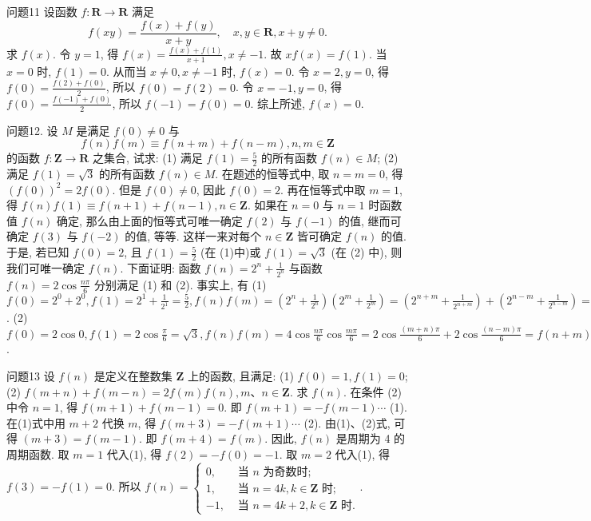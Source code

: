 问题11 设函数 $f: \mathbf{R} \rightarrow \mathbf{R}$ 满足
$$
f(x y)=\frac{f(x)+f(y)}{x+y}, \quad x, y \in \mathbf{R}, x+y \neq 0 .
$$
求 $f(x)$.
令 $y=1$, 得 $f(x)=\frac{f(x)+f(1)}{x+1}, x \neq-1$. 故 $x f(x)=f(1)$. 当 $x=0$ 时, $f(1)=0$. 从而当 $x \neq 0, x \neq-1$ 时, $f(x)=0$. 令 $x=2, y=0$, 得 $f(0)=\frac{f(2)+f(0)}{2}$, 所以 $f(0)=f(2)=0$. 令 $x=-1, y=0$, 得 $f(0)=\frac{f(-1)+f(0)}{2}$, 所以 $f(-1)=f(0)=0$. 综上所述, $f(x)=0$.



问题12. 设 $M$ 是满足 $f(0) \neq 0$ 与
$$
f(n) f(m) \equiv f(n+m)+f(n-m), n, m \in \mathbf{Z}
$$
的函数 $f: \mathbf{Z} \rightarrow \mathbf{R}$ 之集合, 试求:
(1) 满足 $f(1)=\frac{5}{2}$ 的所有函数 $f(n) \in M$;
(2) 满足 $f(1)=\sqrt{3}$ 的所有函数 $f(n) \in M$.
在题述的恒等式中, 取 $n=m=0$, 得 $(f(0))^2=2 f(0)$. 但是 $f(0) \neq 0$, 因此 $f(0)=2$. 再在恒等式中取 $m=1$, 得 $f(n) f(1) \equiv f(n+ 1) +f(n-1), n \in \mathbf{Z}$. 如果在 $n=0$ 与 $n=1$ 时函数值 $f(n)$ 确定, 那么由上面的恒等式可唯一确定 $f(2)$ 与 $f(-1)$ 的值, 继而可确定 $f(3)$ 与 $f(-2)$ 的值, 等等.
这样一来对每个 $n \in \mathbf{Z}$ 皆可确定 $f(n)$ 的值.
于是, 若已知 $f(0)=2$, 且 $f(1)=\frac{5}{2}$ (在 (1)中)或 $f(1)=\sqrt{3}$ (在 (2) 中), 则我们可唯一确定 $f(n)$. 下面证明: 函数 $f(n)=2^n+\frac{1}{2^n}$ 与函数 $f(n)=2 \cos \frac{n \pi}{6}$ 分别满足 (1) 和 (2). 
事实上, 有 (1) $f(0)=2^0+2^0, f(1)=2^1+\frac{1}{2^1}=\frac{5}{2}, f(n) f(m)= \left(2^n+\frac{1}{2^n}\right)\left(2^m+\frac{1}{2^m}\right)=\left(2^{n+m}+\frac{1}{2^{n+m}}\right)+\left(2^{n-m}+\frac{1}{2^{n-m}}\right)=f(n+m)+f(n-m), m, n \in \mathbf{Z}$.
(2) $f(0)=2 \cos 0, f(1)=2 \cos \frac{\pi}{6}=\sqrt{3}, f(n) f(m)= 4 \cos \frac{n \pi}{6} \cos \frac{m \pi}{6}=2 \cos \frac{(m+n) \pi}{6}+2 \cos \frac{(n-m) \pi}{6}=f(n+m)+f(n-m), m, n \in \mathbf{Z}$.



问题13 设 $f(n)$ 是定义在整数集 $\mathbf{Z}$ 上的函数, 且满足:
(1) $f(0)=1, f(1)=0$;
(2) $f(m+n)+f(m-n)=2 f(m) f(n), m 、 n \in \mathbf{Z}$.
求 $f(n)$.
在条件 (2) 中令 $n=1$, 得 $f(m+1)+f(m-1)=0$. 即 $f(m+1)= -f(m-1) \cdots$ (1). 
在(1)式中用 $m+2$ 代换 $m$, 得 $f(m+3)=-f(m+1) \cdots$ (2). 
由(1)、(2)式, 可得 $(m+3)=f(m-1)$. 即 $f(m+4)=f(m)$. 
因此, $f(n)$ 是周期为 4 的周期函数.
取 $m=1$ 代入(1), 得 $f(2)=-f(0)=-1$. 取 $m=2$ 代入(1), 得 $f(3)=-f(1)=0$. 
所以 $f(n)= \begin{cases}0, & \text { 当 } n \text { 为奇数时; } \\ 1, & \text { 当 } n=4 k, k \in \mathbf{Z} \text { 时; } \\ -1, & \text { 当 } n=4 k+2, k \in \mathbf{Z} \text { 时.
}\end{cases}$.



